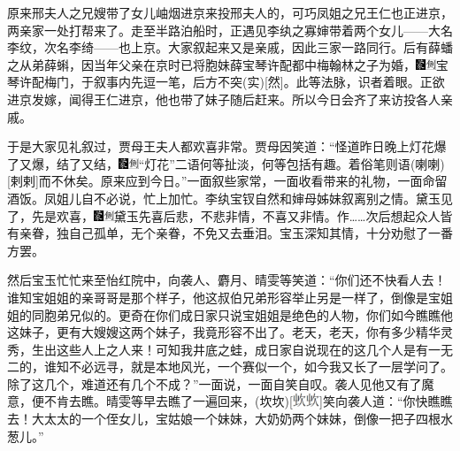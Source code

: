 原来邢夫人之兄嫂带了女儿岫烟进京来投邢夫人的，可巧凤姐之兄王仁也正进京，两亲家一处打帮来了。走至半路泊船时，正遇见李纨之寡婶带着两个女儿------大名李纹，次名李绮------也上京。大家叙起来又是亲戚，因此三家一路同行。后有薛蟠之从弟薛蝌，因当年父亲在京时已将胞妹薛宝琴许配都中梅翰林之子为婚，{\includegraphics[width=3mm]{../Images/00006}\includegraphics[width=3mm]{../Images/00011}\footnotesize \kaishu 宝琴许配梅门，于叙事内先逗一笔，后方不突{(实)}{[}然{]}。此等法脉，识者着眼。}正欲进京发嫁，闻得王仁进京，他也带了妹子随后赶来。所以今日会齐了来访投各人亲戚。

于是大家见礼叙过，贾母王夫人都欢喜非常。贾母因笑道：``怪道昨日晚上灯花爆了又爆，结了又结，{\includegraphics[width=3mm]{../Images/00006}\includegraphics[width=3mm]{../Images/00011}\footnotesize \kaishu ``灯花''二语何等扯淡，何等包括有趣。着俗笔则语{(喇喇)}{[}剌剌{]}而不休矣。}原来应到今日。''一面叙些家常，一面收看带来的礼物，一面命留酒饭。凤姐儿自不必说，忙上加忙。李纨宝钗自然和婶母姊妹叙离别之情。黛玉见了，先是欢喜，{\includegraphics[width=3mm]{../Images/00006}\includegraphics[width=3mm]{../Images/00011}\footnotesize \kaishu 黛玉先喜后悲，不悲非情，不喜又非情。作\ldots{}\ldots{}}次后想起众人皆有亲眷，独自己孤单，无个亲眷，不免又去垂泪。宝玉深知其情，十分劝慰了一番方罢。

然后宝玉忙忙来至怡红院中，向袭人、麝月、晴雯等笑道：``你们还不快看人去！谁知宝姐姐的亲哥哥是那个样子，他这叔伯兄弟形容举止另是一样了，倒像是宝姐姐的同胞弟兄似的。更奇在你们成日家只说宝姐姐是绝色的人物，你们如今瞧瞧他这妹子，更有大嫂嫂这两个妹子，我竟形容不出了。老天，老天，你有多少精华灵秀，生出这些人上之人来！可知我井底之蛙，成日家自说现在的这几个人是有一无二的，谁知不必远寻，就是本地风光，一个赛似一个，如今我又长了一层学问了。除了这几个，难道还有几个不成？''一面说，一面自笑自叹。袭人见他又有了魔意，便不肯去瞧。晴雯等早去瞧了一遍回来，{{(坎坎)}}{[}\includegraphics[width=4mm]{../images/00025}\includegraphics[width=4mm]{../images/00025}{]}笑向袭人道：``你快瞧瞧去！大太太的一个侄女儿，宝姑娘一个妹妹，大奶奶两个妹妹，倒像一把子四根水葱儿。''

